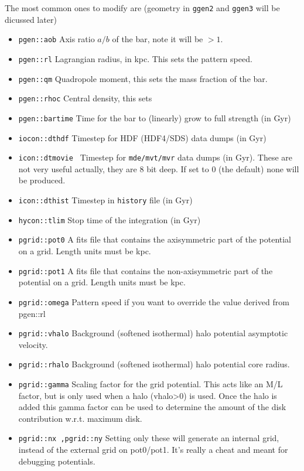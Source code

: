 \documentclass[10pt,dvips]{article}
\begin{document}
The most common ones to modify are (geometry in {\tt ggen2} and {\tt ggen3}
will be dicussed later)

\begin{itemize}

\item
{\tt pgen::aob}
Axis ratio $a/b$ of the bar, note it will be $> 1$.

\item
{\tt pgen::rl}
Lagrangian radius, in kpc. This sets the pattern speed.

\item
{\tt pgen::qm}
Quadropole moment, this sets the mass fraction of the bar.

\item
{\tt pgen::rhoc}
Central density, this sets 

\item
{\tt pgen::bartime}
Time for the bar to (linearly) grow to full strength (in Gyr)

\item
{\tt iocon::dthdf}
Timestep for HDF (HDF4/SDS) data dumps (in Gyr)

\item
{\tt icon::dtmovie }
Timestep for {\tt mde/mvt/mvr} data dumps (in Gyr). These are
not very useful actually, they are 8 bit deep. If set to 0
(the default) none will be produced.

\item
{\tt icon::dthist}
Timestep in {\tt history} file (in Gyr)

\item
{\tt hycon::tlim}
Stop time of the integration (in Gyr)


\item
{\tt pgrid::pot0}
A fits file that contains the axisymmetric part of the potential
on a grid.
Length units must be kpc.

\item
{\tt pgrid::pot1}
A fits file that contains the non-axisymmetric part of the potential
on a grid.
Length units must be kpc.

\item
{\tt pgrid::omega}
Pattern speed if you want to override the value derived from pgen::rl

\item
{\tt pgrid::vhalo}
Background (softened isothermal) halo potential asymptotic velocity.

\item
{\tt pgrid::rhalo}
Background (softened isothermal) halo potential core radius.

\item
{\tt pgrid::gamma}
Scaling factor for the grid potential. This acts like an M/L factor,
but is only used when a halo (vhalo>0) is used.
Once the halo is added  this 
gamma factor can be used to determine the amount of the
disk contribution w.r.t. maximum disk.

\item
{\tt pgrid::nx ,pgrid::ny}
Setting only these will generate an internal grid, instead of the
external grid on pot0/pot1. It's really a cheat and meant for 
debugging potentials.


\end{itemize}
\end{document}
